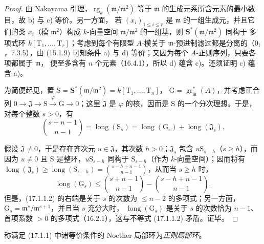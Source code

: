 \begin{proof}
由 Nakayama 引理，$\operatorname{rg}_k(\mathfrak{m}/\mathfrak{m}^2)$ 等于
$\mathfrak{m}$ 的生成元系所含元素的最小数目，故 b) 与 c) 等价。另一方面，
若 $(x_i)_{1\leq i\leq r}$ 是 $\mathfrak{m}$ 的一组生成元，并且它们的类
$\overline{x}_i$（模 $\mathfrak{m}^2$）构成 $k$-向量空间
$\mathfrak{m}/\mathfrak{m}^2$ 的一组基，则
$\mathbf{S}^*(\mathfrak{m}/\mathfrak{m}^2)$ 同构于
多项式环 $k[\mathrm{T}_1,\ldots,\mathrm{T}_r]$；考虑到每个有限型 $A$-模关于
$\mathfrak{m}$-预进制滤过都是分离的（$0_{\mathrm I}$，7.3.5），由 (15.1.9)
可知条件 a) 与 d) 等价；又因为每个 $A$-正则序列，只要各项都属于 $\mathfrak{m}$，
便至多含有 $n$ 个元素（16.4.1），所以 d) 蕴含 c)。还须证明 c) 蕴含 a)。

为简便起见，置
$\mathrm{S}=\mathbf{S}^*(\mathfrak{m}/\mathfrak{m}^2)
=k[\mathrm{T}_1,\ldots,\mathrm{T}_n]$，
$\mathrm{G}=\operatorname{gr}^*_{\mathfrak{m}}(A)$，并考虑正合列
$0\longrightarrow\mathfrak{J}\longrightarrow\mathrm{S}
\xrightarrow{\varphi}\mathrm{G}\longrightarrow0$；这里 $\mathfrak{J}$ 是
$\varphi$ 的核，因而是 $\mathrm{S}$ 的一个分次理想。于是，对每个整数 $s>0$，有
\begin{equation}
\label{0.17.1.1.1-fr}
\tag{17.1.1.1}
  \binom{s+n-1}{n-1}
  =\operatorname{long}(\mathrm{S}_s)
  =\operatorname{long}(\mathrm{G}_s)
  +\operatorname{long}(\mathfrak{J}_s).
\end{equation}

假设 $\mathfrak{J}\neq0$，于是存在齐次元 $u\in\mathfrak{J}$，其次数
$h>0$；$\mathfrak{J}_s$ 包含 $u\mathrm{S}_{s-h}$（$s\geq h$），而因为
$u\neq0$ 且 $\mathrm{S}$ 是整环，$u\mathrm{S}_{s-h}$ 同构于
$\mathrm{S}_{s-h}$（作为 $k$-向量空间）；因而将有
$\operatorname{long}(\mathfrak{J}_s)\geq
\operatorname{long}(\mathrm{S}_{s-h})=\binom{s-h+n-1}{n-1}$，从而当
$s\geq h$ 时，
\begin{equation}
\label{0.17.1.1.2-fr}
\tag{17.1.1.2}
  \operatorname{long}(\mathrm{G}_s)
  \leq\binom{s+n-1}{n-1}-\binom{s-h+n-1}{n-1}.
\end{equation}
但是，(17.1.1.2) 的右端是关于 $s$ 的次数为 $\leq n-2$ 的多项式；另一方面，
$\mathrm{G}_s=\mathfrak{m}^s/\mathfrak{m}^{s+1}$，并且当 $s$ 充分大时，
$\operatorname{long}(\mathrm{G}_s)$ 是关于 $s$ 的次数恰为 $n-1$、首项系数
$>0$ 的多项式（16.2.1），这与不等式 (17.1.1.2) 矛盾。证毕。
\end{proof}

\begin{definition}[17.1.2]
\label{0.17.1.2-fr}
称满足 (17.1.1) 中诸等价条件的 Noether 局部环为\emph{正则局部环}。
\end{definition}

